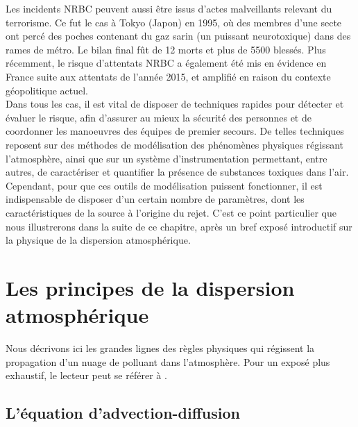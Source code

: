 	Les incidents NRBC peuvent aussi être issus d'actes malveillants relevant du terrorisme. Ce fut le cas à Tokyo (Japon) en 1995, où des membres d'une secte ont percé des poches contenant du gaz sarin (un puissant neurotoxique) dans des rames de métro. Le bilan final fût  de 12 morts et plus de 5500 blessés. Plus récemment, le risque d'attentats NRBC a également été mis en évidence  en France suite aux attentats de l'année 2015, et amplifié en raison du contexte géopolitique actuel.\\
	
	Dans tous les cas, il est vital de disposer de techniques rapides pour détecter et évaluer le risque, afin d'assurer au mieux la sécurité des personnes et de coordonner les manoeuvres des équipes de premier secours. De telles techniques reposent sur des méthodes de modélisation des phénomènes physiques régissant l'atmosphère, ainsi que sur un système d'instrumentation permettant, entre autres, de caractériser et quantifier la présence de substances toxiques dans l'air.\\
	
	Cependant, pour que ces outils de modélisation puissent fonctionner, il est indispensable de disposer d'un certain nombre de paramètres, dont les caractéristiques de la source à l'origine du rejet. C'est ce point particulier que nous illustrerons dans la suite de ce chapitre, après un bref exposé introductif sur la physique de la dispersion atmosphérique.\\


	\section{Les principes de la dispersion atmosphérique}
	
	Nous décrivons ici les grandes lignes des règles physiques qui régissent la propagation d'un nuage de polluant dans l'atmosphère. Pour un exposé plus exhaustif, le lecteur peut se référer à \cite{Sportisse2008}.
	
	\subsection{L'équation d'advection-diffusion}
	
